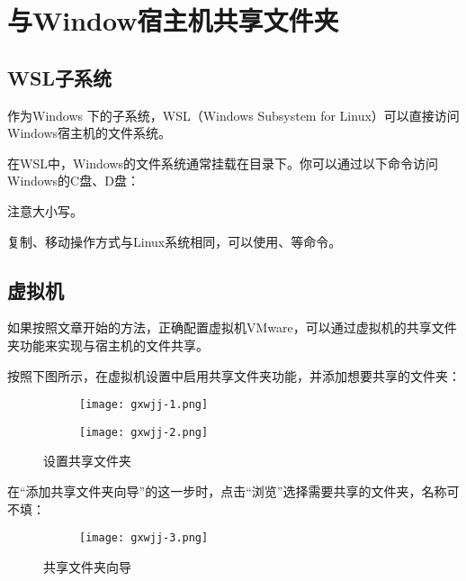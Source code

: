 

\section{与Window宿主机共享文件夹}
\label{sec:appendix-ubuntu-shared-folder}

\subsection{WSL子系统}
作为Windows 下的子系统，WSL（Windows Subsystem for Linux）可以直接访问Windows宿主机的文件系统。

在WSL中，Windows的文件系统通常挂载在目录下。你可以通过以下命令访问Windows的C盘、D盘：
注意大小写。

复制、移动操作方式与Linux系统相同，可以使用、等命令。

\subsection{虚拟机}
如果按照文章开始的方法，正确配置虚拟机VMware，可以通过虚拟机的共享文件夹功能来实现与宿主机的文件共享。

按照下图所示，在虚拟机设置中启用共享文件夹功能，并添加想要共享的文件夹：
\begin{figure}[h]
    \centering
    \begin{subfigure}[c]{0.6\textwidth}
      \texttt{[image: gxwjj-1.png]}
    \end{subfigure}
    \hfill
    \begin{subfigure}[c]{0.35\textwidth}
      \texttt{[image: gxwjj-2.png]}
    \end{subfigure}
    \caption{设置共享文件夹}
    \label{fig:shared-folder-setup}
\end{figure}

在“添加共享文件夹向导”的这一步时，点击“浏览”选择需要共享的文件夹，名称可不填：
\begin{figure}[h]
    \centering
    \begin{subfigure}[c]{0.5\textwidth}
    \texttt{[image: gxwjj-3.png]}
    \end{subfigure}    
    \caption{共享文件夹向导}
    \label{fig:shared-folder-wizard}
\end{figure}

